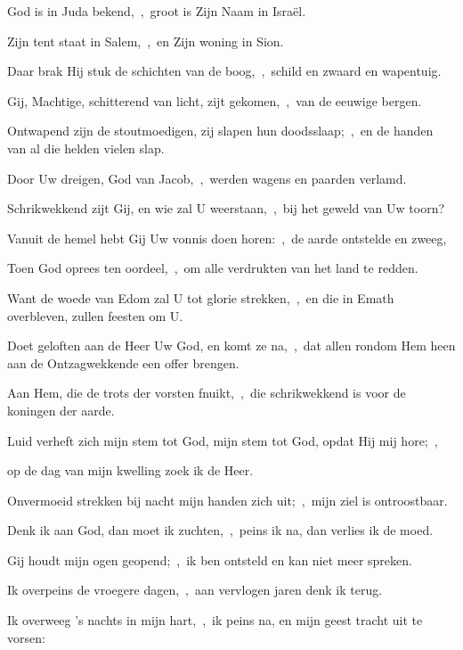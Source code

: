 \documentclass[12pt,twoside,a5paper]{article}
\begin{document}

\begin{halfparskip}

  God is in Juda bekend,~\sep\ groot is Zijn Naam in Israël.

  Zijn tent staat in Salem,~\sep\ en Zijn woning in Sion.

  Daar brak Hij stuk de schichten van de boog,~\sep\ schild en zwaard en wapentuig.

  Gij, Machtige, schitterend van licht, zijt gekomen,~\sep\ van de eeuwige bergen.

  Ontwapend zijn de stoutmoedigen, zij slapen hun doodsslaap;~\sep\ en de handen van al die helden vielen slap.

  Door Uw dreigen, God van Jacob,~\sep\ werden wagens en paarden verlamd.
\end{halfparskip}

\begin{halfparskip}

  Schrikwekkend zijt Gij, en wie zal U weerstaan,~\sep\ bij het geweld van Uw toorn?

  Vanuit de hemel hebt Gij Uw vonnis doen horen:~\sep\ de aarde ontstelde en zweeg,

  Toen God oprees ten oordeel,~\sep\ om alle verdrukten van het land te redden.

  Want de woede van Edom zal U tot glorie strekken,~\sep\ en die in Emath overbleven, zullen feesten om U.

  Doet geloften aan de Heer Uw God, en komt ze na,~\sep\ dat allen rondom Hem heen aan de Ontzagwekkende een offer brengen.

  Aan Hem, die de trots der vorsten fnuikt,~\sep\ die schrikwekkend is voor de koningen der aarde.
\end{halfparskip}


\begin{halfparskip}
  Luid verheft zich mijn stem tot God, mijn stem tot God, opdat Hij mij hore;~\sep

  op de dag van mijn kwelling zoek ik de Heer.

  Onvermoeid strekken bij nacht mijn handen zich uit;~\sep\ mijn ziel is ontroostbaar.

  Denk ik aan God, dan moet ik zuchten,~\sep\ peins ik na, dan verlies ik de moed.

  Gij houdt mijn ogen geopend;~\sep\ ik ben ontsteld en kan niet meer spreken.

  Ik overpeins de vroegere dagen,~\sep\ aan vervlogen jaren denk ik terug.

  Ik overweeg 's nachts in mijn hart,~\sep\ ik peins na, en mijn geest tracht uit te vorsen:
\end{halfparskip}
\end{document}
